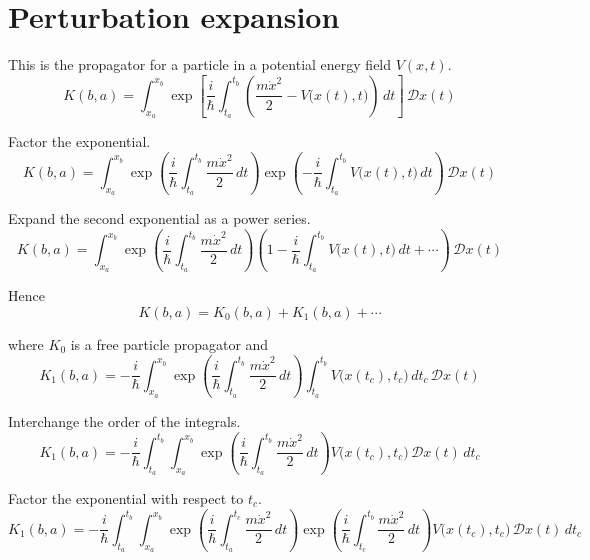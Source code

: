 

\section*{Perturbation expansion}

This is the propagator for a particle in a potential energy field $V(x,t)$.
\begin{equation*}
K(b,a)=\int_{x_a}^{x_b}\exp\left[
\frac{i}{\hbar}
\int_{t_a}^{t_b}
\left(\frac{m\dot x^2}{2}-V\bigl(x(t),t\bigr)\right)\,dt
\right]
\,\mathscr Dx(t)
\end{equation*}

Factor the exponential.
\begin{equation*}
K(b,a)=\int_{x_a}^{x_b}
\exp\left(\frac{i}{\hbar}\int_{t_a}^{t_b}\frac{m\dot x^2}{2}\,dt\right)
\exp\left(-\frac{i}{\hbar}\int_{t_a}^{t_b}V\bigl(x(t),t\bigr)\,dt\right)
\,\mathscr Dx(t)
\end{equation*}

Expand the second exponential as a power series.
\begin{equation*}
K(b,a)=\int_{x_a}^{x_b}
\exp\left(\frac{i}{\hbar}\int_{t_a}^{t_b}\frac{m\dot x^2}{2}\,dt\right)
\left(1-\frac{i}{\hbar}\int_{t_a}^{t_b}V\bigl(x(t),t\bigr)\,dt+\cdots\right)
\,\mathscr Dx(t)
\end{equation*}

Hence
\begin{equation*}
K(b,a)=K_0(b,a)+K_1(b,a)+\cdots
\end{equation*}

where $K_0$ is a free particle propagator and
\begin{equation*}
K_1(b,a)=-\frac{i}{\hbar}\int_{x_a}^{x_b}
\exp\left(\frac{i}{\hbar}\int_{t_a}^{t_b}\frac{m\dot x^2}{2}\,dt\right)
\int_{t_a}^{t_b}
V\bigl(x(t_c),t_c\bigr)
\,dt_c\,\mathscr Dx(t)
\end{equation*}

Interchange the order of the integrals.
\begin{equation*}
K_1(b,a)=-\frac{i}{\hbar}\int_{t_a}^{t_b}\int_{x_a}^{x_b}
\exp\left(\frac{i}{\hbar}\int_{t_a}^{t_b}\frac{m\dot x^2}{2}\,dt\right)
V\bigl(x(t_c),t_c\bigr)
\,\mathscr Dx(t)\,dt_c
\end{equation*}

Factor the exponential with respect to $t_c$.
\begin{equation*}
K_1(b,a)=-\frac{i}{\hbar}\int_{t_a}^{t_b}\int_{x_a}^{x_b}
\exp\left(\frac{i}{\hbar}\int_{t_a}^{t_c}\frac{m\dot x^2}{2}\,dt\right)
\exp\left(\frac{i}{\hbar}\int_{t_c}^{t_b}\frac{m\dot x^2}{2}\,dt\right)
V\bigl(x(t_c),t_c\bigr)
\,\mathscr Dx(t)\,dt_c
\end{equation*}

